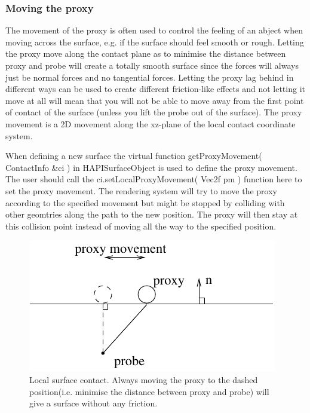 \subsubsection{Moving the proxy}
The movement of the proxy is often used to control the feeling of an abject when moving across the surface, e.g. if the surface should feel smooth or rough. Letting the proxy move along the contact plane as to minimise the distance between proxy and probe will create a totally smooth surface since the forces will always just be normal forces and no tangential forces. Letting the proxy lag behind in different ways can be used to create different friction-like effects and not letting it move at all will mean that you will not be able to move away from the first point of contact of the surface (unless you lift the probe out of the surface). The proxy movement is a 2D movement along the xz-plane of the local contact coordinate system. 

When defining a new surface the virtual function getProxyMovement( ContactInfo \&ci ) in HAPISurfaceObject is used to define the proxy movement. The user should call the ci.setLocalProxyMovement( Vec2f pm ) function here to set the proxy movement. The rendering system will try to move the proxy according to the specified movement but might be stopped by colliding with other geomtries along the path to the new position. The proxy will then stay at this collision point instead of moving all the way to the specified position.

\begin{figure} 
  \centering 
  \includegraphics{images/surface.pdf}
  \caption{Local surface contact. Always moving the proxy to the dashed position(i.e. minimise the distance between proxy and probe) will give a surface without any friction.}
  \label{proxy movement} 
\end{figure}

